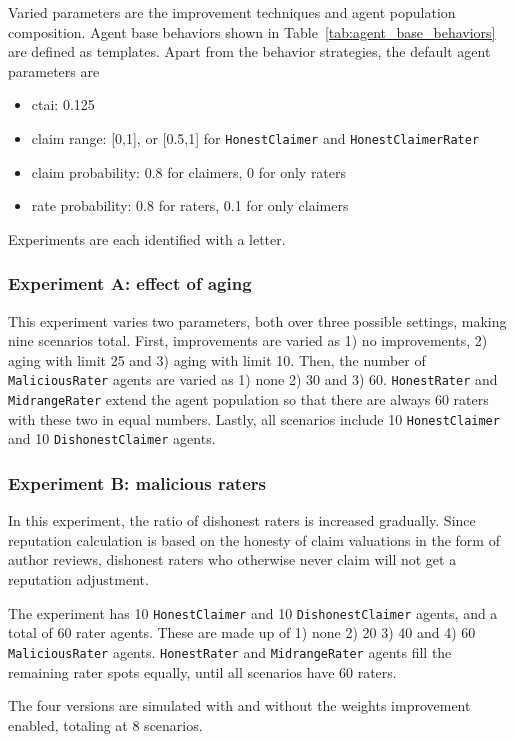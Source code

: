\documentclass[%
    ]{\PathToTumTemplate/thesis/tum_thesis}
\begin{document}
Varied parameters are the improvement techniques and agent population composition.
Agent base behaviors shown in Table~\ref{tab:agent_base_behaviors} are defined as templates.
Apart from the behavior strategies, the default agent parameters are
\begin{itemize}
	\item \gls{ctai}: 0.125
	\item claim range: [0,1], or [0.5,1] for  \texttt{HonestClaimer} and \texttt{HonestClaimerRater}
	\item claim probability: 0.8 for claimers, 0 for only raters
	\item rate probability: 0.8 for raters, 0.1 for only claimers
\end{itemize}

Experiments are each identified with a letter.

\subsubsection{Experiment A: effect of aging}
This experiment varies two parameters, both over three possible settings, making nine scenarios total.
First, improvements are varied as 1) no improvements, 2) aging with limit 25 and 3) aging with limit 10.
Then, the number of \texttt{MaliciousRater} agents are varied as 1) none 2) 30 and 3) 60.
\texttt{HonestRater} and \texttt{MidrangeRater} extend the agent population so that there are always 60 raters with these two in equal numbers.
Lastly, all scenarios include 10 \texttt{HonestClaimer} and 10 \texttt{DishonestClaimer} agents.

\subsubsection{Experiment B: malicious raters}
In this experiment, the ratio of dishonest raters is increased gradually.
Since reputation calculation is based on the honesty of claim valuations in the form of author reviews, dishonest raters who otherwise never claim will not get a reputation adjustment.

The experiment has 10 \texttt{HonestClaimer} and 10 \texttt{DishonestClaimer} agents, and a total of 60 rater agents.
These are made up of 1) none 2) 20 3) 40 and 4) 60 \texttt{MaliciousRater} agents.
\texttt{HonestRater} and \texttt{MidrangeRater} agents fill the remaining rater spots equally, until all scenarios have 60 raters.

The four versions are simulated with and without the weights improvement enabled, totaling at 8 scenarios.
\end{document}
